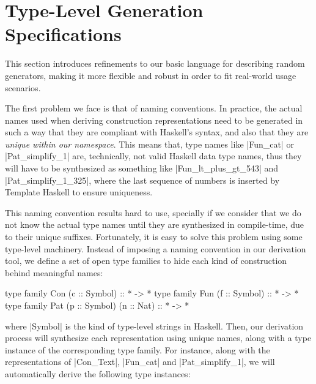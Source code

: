 \section{Type-Level Generation Specifications}
\label{sec:typelevel}

%
This section introduces refinements to our basic language for describing random
generators, making it more flexible and robust in order to fit real-world usage
scenarios.


%
%
%
The first problem we face is that of naming conventions.
%
In practice, the actual names used when deriving construction representations
need to be generated in such a way that they are compliant with Haskell's
syntax, and also that they are \emph{unique within our namespace}.
%
This means that, type names like |Fun_cat| or |Pat_simplify_1| are, technically,
not valid Haskell data type names, thus they will have to be synthesized as
something like |Fun_lt_plus_gt_543| and |Pat_simplify_1_325|, where the last
sequence of numbers is inserted by Template Haskell to ensure uniqueness.


This naming convention results hard to use, specially if we consider that we do
not know the actual type names until they are synthesized in compile-time, due
to their unique suffixes.
%
Fortunately, it is easy to solve this problem using some type-level machinery.
%
Instead of imposing a naming convention in our derivation tool, we define a set
of open type families to hide each kind of construction behind meaningful names:

\begin{code}
type family Con (c :: Symbol)             :: * -> *
type family Fun (f :: Symbol)             :: * -> *
type family Pat (p :: Symbol) (n :: Nat)  :: * -> *
\end{code}
%
where |Symbol| is the kind of type-level strings in Haskell.
%
Then, our derivation process will synthesize each representation using unique
names, along with a type instance of the corresponding type family.
%
For instance, along with the representations of |Con_Text|, |Fun_cat| and
|Pat_simplify_1|, we will automatically derive the following type instances:


